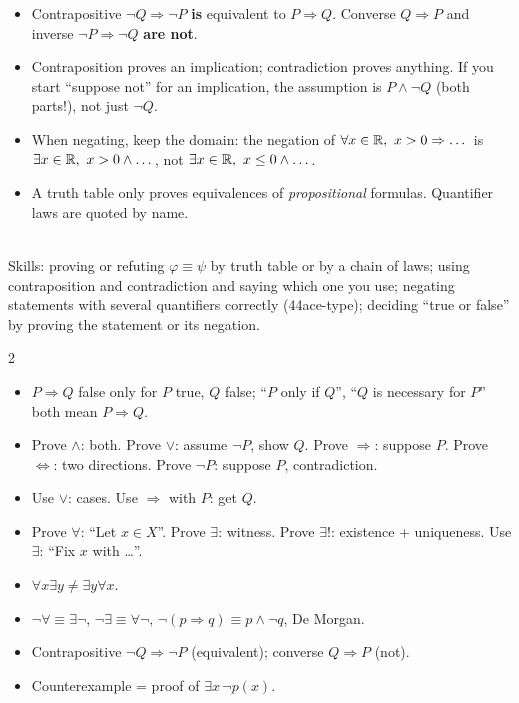 \begin{warn}
\begin{itemize}
\item Contrapositive $\neg Q\Rightarrow\neg P$ \textbf{is} equivalent to $P\Rightarrow Q$. Converse $Q\Rightarrow P$ and inverse $\neg P\Rightarrow\neg Q$ \textbf{are not}.
\item Contraposition proves an implication; contradiction proves anything. If you start ``suppose not'' for an implication, the assumption is $P\wedge\neg Q$ (both parts!), not just $\neg Q$.
\item When negating, keep the domain: the negation of $\forall x\in\mathbb{R},\ x>0\Rightarrow\dots$ is $\exists x\in\mathbb{R},\ x>0\wedge\dots$, not $\exists x\in\R,\ x\le0\wedge\dots$.
\item A truth table only proves equivalences of \emph{propositional} formulas. Quantifier laws are quoted by name.
\end{itemize}
\end{warn}

\begin{planning}[1.3 and 1.E]
\quad {}\\[3pt]
Skills: proving or refuting $\varphi\equiv\psi$ by truth table or by a chain of laws; using contraposition and contradiction and saying which one you use; negating statements with several quantifiers correctly (44ace-type); deciding ``true or false'' by proving the statement or its negation.
\end{planning}


\begin{multicols}{2}\small
\begin{itemize}
\item $P\Rightarrow Q$ false only for $P$ true, $Q$ false; ``$P$ only if $Q$'', ``$Q$ is necessary for $P$'' both mean $P\Rightarrow Q$.
\item Prove $\wedge$: both. Prove $\vee$: assume $\neg P$, show $Q$. Prove $\Rightarrow$: suppose $P$. Prove $\Leftrightarrow$: two directions. Prove $\neg P$: suppose $P$, contradiction.
\item Use $\vee$: cases. Use $\Rightarrow$ with $P$: get $Q$.
\item Prove $\forall$: ``Let $x\in X$''. Prove $\exists$: witness. Prove $\exists!$: existence + uniqueness. Use $\exists$: ``Fix $x$ with \dots''.
\item $\forall x\exists y\neq\exists y\forall x$.
\item $\neg\forall\equiv\exists\neg$, $\neg\exists\equiv\forall\neg$, $\neg(p\Rightarrow q)\equiv p\wedge\neg q$, De Morgan.
\item Contrapositive $\neg Q\Rightarrow\neg P$ (equivalent); converse $Q\Rightarrow P$ (not).
\item Counterexample = proof of $\exists x\,\neg p(x)$.
\end{itemize}
\end{multicols}

